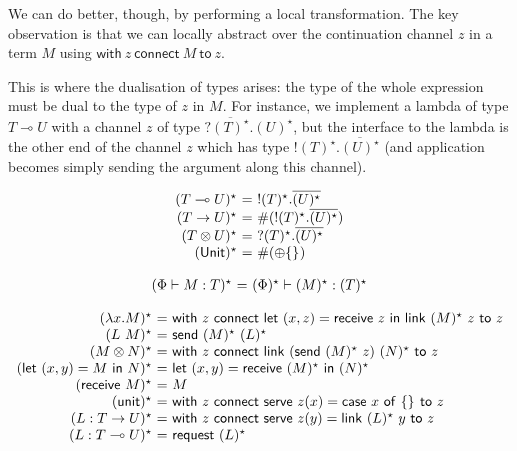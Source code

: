 \documentclass{easychair}
\makeatletter
\newcommand{\ba}{\begin{array}}
\newcommand{\ea}{\end{array}}
\newenvironment{equations}{\[\ba{@{}r@{~}c@{~}l@{}}}{\ea\]}
\newcommand{\key}{\mathsf}
\newcommand{\set}[1]{\{ #1 \}}
\newcommand{\row}[2]{\set{#1}_{#2}}
\newcommand{\gvOutput}[2]{!{#1}.{#2}}
\newcommand{\gvInput}[2]{?{#1}.{#2}}
\newcommand{\gvPlus}[2]{\oplus \row{#1}{#2}}
\newcommand{\gvService}[1]{\#{#1}}
\newcommand{\gvDual}[1]{\overline{#1}}
\newcommand{\gvj}[3]{{#1} \vdash {#2} : {#3}}
\newcommand{\lolli}{\multimap}
\newcommand{\gvLinFun}[2]{{#1} \lolli {#2}}
\newcommand{\gvUnFun}[2]{{#1} \to {#2}}
\newcommand{\gvTimes}[2]{{#1} \otimes {#2}}
\newcommand{\gvUnitType}{\key{Unit}}
\newcommand{\gvUnit}{\key{unit}}
\newcommand{\gvLink}[2]{\key{link}~{#1}~{#2}}
\newcommand{\gvLam}[2]{\lambda {#1}.{#2}}
\newcommand{\gvApp}[2]{{#1}~{#2}}
\newcommand{\gvPair}[2]{({#1},{#2})}
\newcommand{\gvLet}[3]{\key{let}~{#1}={#2}~\key{in}~{#3}}
\newcommand{\gvSend}[2]{\key{send}~{#1}~{#2}}
\newcommand{\gvReceive}[1]{\key{receive}~{#1}}
\newcommand{\gvCase}[2]{\key{case}~{#1}~\key{of}~{#2}}
\newcommand{\gvWith}[3]{\key{with}~{#1}~\key{connect}~{#2}~\key{to}~{#3}}
\newcommand{\gvServe}[3]{\key{serve}~{#1}({#2})={#3}}
\newcommand{\gvRequest}[1]{\key{request}~{#1}}
\makeatother
\begin{document}
\newcommand{\gvtogv}[1]{({#1})^\star}

We can do better, though, by performing a local transformation. The
key observation is that we can locally abstract over the continuation
channel $z$ in a term $M$ using $\gvWith{z}{M}{z}$.

This is where the dualisation of types arises: the type of the whole
expression must be dual to the type of $z$ in $M$. For instance, we
implement a lambda of type $\gvLinFun{T}{U}$ with a channel $z$ of
type $\gvInput{\gvDual{\gvtogv{T}}}{\gvtogv{U}}$, but the interface to
the lambda is the other end of the channel $z$ which has type
$\gvOutput{\gvtogv{T}}{\gvDual{\gvtogv{U}}}$ (and application becomes
simply sending the argument along this channel).

\begin{equations}
\gvtogv{\gvLinFun{T}{U}} &=& \gvOutput{\gvtogv{T}}{\gvDual{\gvtogv{U}}} \\
\gvtogv{\gvUnFun{T}{U}} &=& \gvService{(\gvOutput{\gvtogv{T}}{\gvDual{\gvtogv{U}}})} \\
\gvtogv{\gvTimes{T}{U}} &=& \gvInput{\gvtogv{T}}{\gvDual{\gvtogv{U}}} \\
\gvtogv{\gvUnitType} &=& \gvService{(\gvPlus{}{})} \\
\end{equations}%

\begin{equations}
\gvtogv{\gvj{\Phi}{M}{T}} &=& \gvj{\gvtogv{\Phi}}{\gvtogv{M}}{\gvtogv{T}} \\
\end{equations}%

\begin{equations}
\gvtogv{\gvLam{x}{M}} &=& \gvWith{z}{\gvLet{\gvPair{x}{z}}{\gvReceive{z}}{\gvLink{\gvtogv{M}}{z}}}{z} \\
\gvtogv{\gvApp{L}{M}} &=& \gvSend{\gvtogv{M}}{\gvtogv{L}} \\
\gvtogv{\gvTimes{M}{N}} &=&
  \gvWith{z}
    {\gvLink{(\gvSend{\gvtogv{M}}{z})}{\gvtogv{N}}}
    {z} \\
\gvtogv{\gvLet{\gvPair{x}{y}}{M}{N}} &=&
    \gvLet{\gvPair{x}{y}}{\gvReceive{\gvtogv{M}}}{\gvtogv{N}} \\
\gvtogv{\gvReceive{M}} &=& M \\
\gvtogv{\gvUnit} &=&
    \gvWith{z}
    {\gvServe{z}{x}{\gvCase{x}{\row{}{}}}}
    {z} \\
\gvtogv{L : \gvUnFun{T}{U}} &=&
  \gvWith{z}{\gvServe{z}{y}{\gvLink{\gvtogv{L}}{y}}}{z} \\
\gvtogv{L : \gvLinFun{T}{U}} &=& \gvRequest{\gvtogv{L}} \\
\end{equations}
\end{document}
